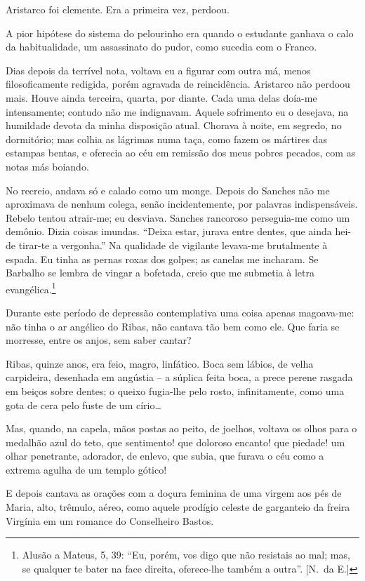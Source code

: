 Aristarco foi clemente. Era a primeira vez, perdoou. 

A pior hipótese do sistema do pelourinho era quando o
estudante ganhava o calo da habitualidade, um assassinato do pudor,
como sucedia com o Franco. 

Dias depois da terrível nota, voltava eu a
figurar com outra má, menos filosoficamente redigida, porém agravada de reincidência. 
Aristarco não perdoou mais. Houve ainda
terceira, quarta, por diante. Cada uma delas doía{}-me intensamente;
contudo não me indignavam. Aquele sofrimento eu o desejava, na
humildade devota da minha disposição atual. Chorava à noite, em
segredo, no dormitório; mas colhia as lágrimas numa taça, como fazem os
mártires das estampas bentas, e oferecia ao céu em remissão dos meus
pobres pecados, com as notas más boiando. 

No recreio, andava só e
calado como um monge. Depois do Sanches não me aproximava de nenhum
colega, senão incidentemente, por palavras indispensáveis. Rebelo
tentou atrair{}-me; eu desviava. Sanches rancoroso perseguia{}-me como
um demônio. Dizia coisas imundas. ``Deixa estar, jurava entre dentes,
que ainda hei{}-de tirar{}-te a vergonha.'' Na qualidade de vigilante
levava{}-me brutalmente à espada. Eu tinha as pernas roxas dos golpes;
as canelas me incharam. Se Barbalho se lembra de vingar a bofetada,
creio que me submetia à letra evangélica.\footnote{ Alusão a Mateus, 5, 39: 
``Eu, porém, vos digo que não resistais ao mal; mas, se qualquer te bater 
na face direita, oferece-lhe também a outra''. [N.~da E.]} 

Durante este período de
depressão contemplativa uma coisa apenas magoava{}-me: não tinha o ar
angélico do Ribas, não cantava tão bem como ele. Que faria se morresse,
entre os anjos, sem saber cantar? 

Ribas, quinze anos, era feio, magro,
linfático. Boca sem lábios, de velha carpideira, desenhada em angústia
 -- a súplica feita boca, a prece perene rasgada em beiços sobre
dentes; o queixo fugia{}-lhe pelo rosto, infinitamente, como uma gota
de cera pelo fuste de um círio\ldots 

Mas, quando, na capela, mãos postas
ao peito, de joelhos, voltava os olhos para o medalhão azul do teto,
que sentimento! que doloroso encanto! que piedade! um olhar penetrante,
adorador, de enlevo, que subia, que furava o céu como a extrema agulha
de um templo gótico! 

E depois cantava as orações com a doçura feminina
de uma virgem aos pés de Maria, alto, trêmulo, aéreo, como aquele
prodígio celeste de garganteio da freira Virgínia em um romance do
Conselheiro Bastos. 

